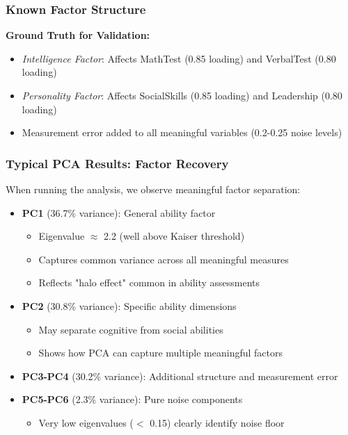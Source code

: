 \documentclass[aspectratio=169]{beamer}
\begin{document}
\begin{frame}
    \frametitle{Known Factor Structure}
    \textbf{Ground Truth for Validation:}
    \begin{itemize}
        \item \textit{Intelligence Factor}: Affects MathTest (0.85 loading) and VerbalTest (0.80 loading) \pause
        \item \textit{Personality Factor}: Affects SocialSkills (0.85 loading) and Leadership (0.80 loading) \pause
        \item Measurement error added to all meaningful variables (0.2-0.25 noise levels) \pause
    \end{itemize}
\end{frame}

\begin{frame}
    \frametitle{Typical PCA Results: Factor Recovery}
    When running the analysis, we observe meaningful factor separation:
    \begin{itemize}
        \item \textbf{PC1} (36.7\% variance): General ability factor \pause
              \begin{itemize}
                  \item Eigenvalue $\approx$ 2.2 (well above Kaiser threshold) \pause
                  \item Captures common variance across all meaningful measures \pause
                  \item Reflects "halo effect" common in ability assessments \pause
              \end{itemize}
        \item \textbf{PC2} (30.8\% variance): Specific ability dimensions \pause
              \begin{itemize}
                  \item May separate cognitive from social abilities \pause
                  \item Shows how PCA can capture multiple meaningful factors \pause
              \end{itemize}
        \item \textbf{PC3-PC4} (30.2\% variance): Additional structure and measurement error \pause
        \item \textbf{PC5-PC6} (2.3\% variance): Pure noise components \pause
              \begin{itemize}
                  \item Very low eigenvalues ($<$ 0.15) clearly identify noise floor \pause
              \end{itemize}
    \end{itemize}
\end{frame}
\end{document}
